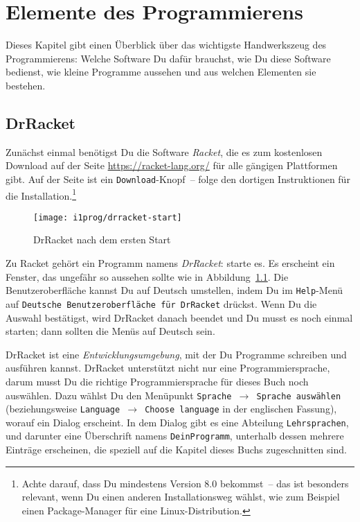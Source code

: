 
\chapter{Elemente des Programmierens}
\label{cha:whats-programming}

Dieses Kapitel gibt einen Überblick über das wichtigste Handwerkszeug
des Programmierens: Welche Software Du dafür brauchst, wie Du diese
Software bedienst, wie kleine Programme aussehen und aus welchen
Elementen sie bestehen.

\section{DrRacket}

Zunächst einmal benötigst Du die Software \textit{Racket}, die es zum
kostenlosen Download auf der Seite \url{https://racket-lang.org/} für
alle gängigen Plattformen gibt.  Auf der Seite ist ein
\texttt{Download}-Knopf~-- folge den dortigen Instruktionen für die
Installation.\footnote{Achte darauf, dass Du mindestens Version 8.0
bekommst~-- das ist besonders relevant, wenn Du einen anderen
Installationsweg wählst, wie zum Beispiel einen Package-Manager für
eine Linux-Distribution.}

\begin{figure}[tb]
  \centering
  \texttt{[image: i1prog/drracket-start]}
  \caption{DrRacket nach dem ersten Start}
  \label{fig:drracket-start}
\end{figure}

Zu Racket gehört ein Programm namens
\textit{DrRacket}: starte es.  Es erscheint ein
Fenster, das ungefähr so aussehen sollte wie in
Abbildung~\ref{fig:drracket-start}.  Die Benutzeroberfläche kannst
Du auf Deutsch umstellen, indem Du im \texttt{Help}-Menü auf \texttt{Deutsche
  Benutzeroberfläche für DrRacket} drückst.  Wenn Du die Auswahl
bestätigst, wird DrRacket danach beendet und Du musst es noch einmal
starten; dann sollten die Menüs auf Deutsch sein.

DrRacket ist eine \textit{Entwicklungsumgebung}, mit der Du Programme
schreiben und ausführen kannst.  DrRacket unterstützt nicht nur eine
Programmiersprache, darum musst Du die richtige Programmiersprache für
dieses Buch noch auswählen.  Dazu wählst Du den Menüpunkt
\texttt{Sprache $\rightarrow$ Sprache auswählen} (beziehungsweise
\texttt{Language $\rightarrow$ Choose language} in der englischen
Fassung), worauf ein Dialog erscheint.  In dem Dialog gibt es eine
Abteilung \texttt{Lehrsprachen}, und darunter eine
Überschrift namens \texttt{DeinProgramm}, unterhalb dessen mehrere
Einträge erscheinen, die speziell auf die Kapitel dieses Buchs
zugeschnitten sind.

